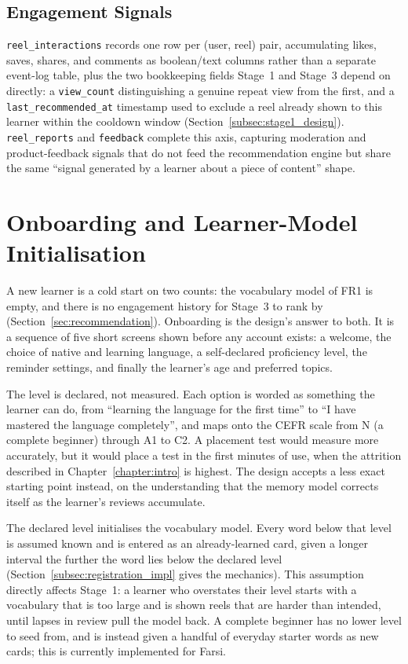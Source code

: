     \subsection{Engagement Signals}
    \label{subsec:data_engagement}
    \texttt{reel\_interactions} records one row per (user, reel) pair, accumulating likes, saves, shares, and comments as boolean/text columns rather than a separate event-log table, plus the two bookkeeping fields Stage~1 and Stage~3 depend on directly: a \texttt{view\_count} distinguishing a genuine repeat view from the first, and a \texttt{last\_recommended\_at} timestamp used to exclude a reel already shown to this learner within the cooldown window (Section~\ref{subsec:stage1_design}). \texttt{reel\_reports} and \texttt{feedback} complete this axis, capturing moderation and product-feedback signals that do not feed the recommendation engine but share the same ``signal generated by a learner about a piece of content'' shape.


\section{Onboarding and Learner-Model Initialisation}
\label{sec:onboarding_design}
    A new learner is a cold start on two counts: the vocabulary model of FR1 is empty, and there is no engagement history for Stage~3 to rank by (Section~\ref{sec:recommendation}). Onboarding is the design's answer to both. It is a sequence of five short screens shown before any account exists: a welcome, the choice of native and learning language, a self-declared proficiency level, the reminder settings, and finally the learner's age and preferred topics.

    The level is declared, not measured. Each option is worded as something the learner can do, from ``learning the language for the first time'' to ``I have mastered the language completely'', and maps onto the CEFR scale from N (a complete beginner) through A1 to C2. A placement test would measure more accurately, but it would place a test in the first minutes of use, when the attrition described in Chapter~\ref{chapter:intro} is highest. The design accepts a less exact starting point instead, on the understanding that the memory model corrects itself as the learner's reviews accumulate.

    The declared level initialises the vocabulary model. Every word below that level is assumed known and is entered as an already-learned card, given a longer interval the further the word lies below the declared level (Section~\ref{subsec:registration_impl} gives the mechanics). This assumption directly affects Stage~1: a learner who overstates their level starts with a vocabulary that is too large and is shown reels that are harder than intended, until lapses in review pull the model back. A complete beginner has no lower level to seed from, and is instead given a handful of everyday starter words as new cards; this is currently implemented for Farsi.

